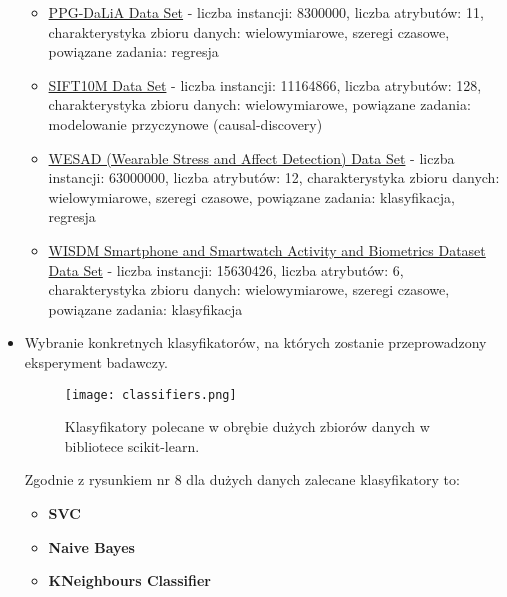 \documentclass{article}
\begin{document}
\begin{itemize}
\begin{itemize}
        \item \href{https://archive.ics.uci.edu/ml/datasets/PPG-DaLiA}{PPG-DaLiA Data Set} - liczba instancji: 8300000, liczba atrybutów: 11, charakterystyka zbioru danych: wielowymiarowe, szeregi czasowe, powiązane zadania: regresja %
        \item \href{https://archive.ics.uci.edu/ml/datasets/SIFT10M}{SIFT10M Data Set} - liczba instancji: 11164866, liczba atrybutów: 128, charakterystyka zbioru danych: wielowymiarowe, powiązane zadania: modelowanie przyczynowe (causal-discovery) %
        \item \href{https://archive.ics.uci.edu/ml/datasets/WESAD+%28Wearable+Stress+and+Affect+Detection%29}{WESAD (Wearable Stress and Affect Detection) Data Set} - liczba instancji: 63000000, liczba atrybutów: 12, charakterystyka zbioru danych: wielowymiarowe, szeregi czasowe, powiązane zadania: klasyfikacja, regresja %
        \item \href{https://archive.ics.uci.edu/ml/datasets/WISDM+Smartphone+and+Smartwatch+Activity+and+Biometrics+Dataset+}{WISDM Smartphone and Smartwatch Activity and Biometrics Dataset Data Set} - liczba instancji: 15630426, liczba atrybutów: 6, charakterystyka zbioru danych: wielowymiarowe, szeregi czasowe, powiązane zadania: klasyfikacja %
    \end{itemize}\newline
    \item Wybranie konkretnych klasyfikatorów, na których zostanie przeprowadzony eksperyment badawczy.\newline
    \begin{figure}[h!]
    \texttt{[image: classifiers.png]}
    \caption{Klasyfikatory polecane  w obrębie dużych zbiorów danych w bibliotece scikit-learn.} 
    \label{fig:obrazek_cc1}
    \end{figure}
    \newline
    Zgodnie z rysunkiem nr 8 dla dużych danych zalecane klasyfikatory to:
    \begin{itemize}
        \item \textbf{SVC}
        \item \textbf{Naive Bayes}
        \item \textbf{KNeighbours Classifier}

\end{itemize}
\end{itemize}
\end{document}
